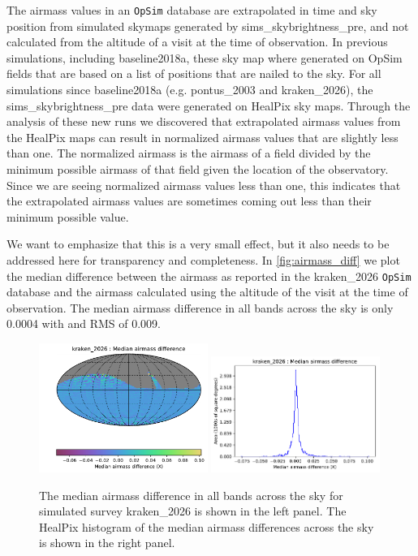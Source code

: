 \documentclass[DM,authoryear,toc]{lsstdoc}
\newcommand{\opsim}{\texttt{OpSim}\xspace}
\begin{document}
The airmass values in an \opsim database are extrapolated in time and sky position from simulated skymaps generated
by sims\_skybrightness\_pre, and not calculated from the altitude of a visit at the time of observation.
In previous simulations, including baseline2018a, these sky map where generated on OpSim fields that are
based on a list of positions that are nailed to the sky. For all simulations since baseline2018a
(e.g. pontus\_2003 and kraken\_2026), the sims\_skybrightness\_pre data were generated on HealPix
sky maps. Through the analysis of these new runs we discovered that extrapolated airmass values
from the HealPix maps can result in normalized airmass values that are slightly less than one. The normalized
airmass is the airmass of a field divided by the minimum possible airmass of that field given the location
of the observatory. Since we are seeing normalized airmass values less than one, this indicates that the
extrapolated airmass values are sometimes coming out less than their minimum possible value.

We want to emphasize that this is a very small effect, but it also needs to be addressed here for transparency and
completeness.  In \autoref{fig:airmass_diff} we plot the median difference between the airmass as reported in the kraken\_2026
\opsim database and the airmass calculated using the altitude of the visit at the time of observation. The median airmass
difference in all bands across the sky is only 0.0004 with and RMS of 0.009.

\begin{figure}[ht]
\centering
\includegraphics[width=0.49\textwidth]{figures/kraken_2026_Median_airmass_difference_HEAL_SkyMap.pdf}
\includegraphics[width=0.49\textwidth]{figures/kraken_2026_Median_airmass_difference_HEAL_Histogram.pdf}
\caption{The median airmass difference  in all bands across the sky for simulated survey
kraken\_2026 is shown in the left panel. The HealPix histogram of the median airmass differences
across the sky is shown in the right panel.}
\label{fig:airmass_diff}
\end{figure}
\end{document}
